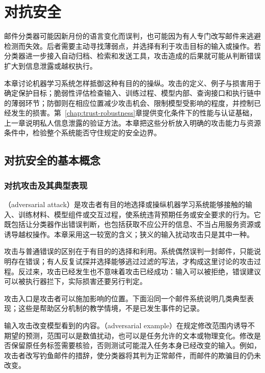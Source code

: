 \chapter{对抗安全}
\label{chap:trust-security}

邮件分类器可能因新月份的语言变化而误判，也可能因为有人专门改写邮件来逃避检测而失效。后者需要主动寻找薄弱点，并选择有利于攻击目标的输入或操作。若分类器进一步接入自动归档、检索和发送工具，攻击造成的后果就可能从判断错误扩大到信息泄露或越权执行。

本章讨论机器学习系统怎样抵御这种有目的的操纵。攻击的定义、例子与损害用于确定保护目标；脆弱性评估检查输入、训练过程、模型内部、查询接口和执行链中的薄弱环节；防御则在相应位置减少攻击机会、限制模型受影响的程度，并控制已经发生的损害。第~\ref{chap:trust-robustness}章提供变化条件下的性能与认证基础，上一章说明私人信息泄露的验证方法。本章把这些分析放入明确的攻击能力与资源条件中，检验整个系统能否守住规定的安全边界。

\section{对抗安全的基本概念}
\label{sec:security-threats}

\subsection{对抗攻击及其典型表现}
\label{sec:security-attack-definition}

（adversarial attack）是攻击者有目的地选择或操纵机器学习系统能够接触的输入、训练材料、模型组件或交互过程，使系统违背预期任务或安全要求的行为。它既包括让分类器作出错误判断，也包括获取不应公开的信息、不当占用服务资源或诱导越权操作。本章采用这一较宽的含义；狭义的输入扰动攻击只是其中一种。

攻击与普通错误的区别在于有目的的选择和利用。系统偶然误判一封邮件，只能说明存在错误；有人反复试探并选择能够逃过过滤的写法，才构成这里讨论的攻击过程。反过来，攻击已经发生也不意味着攻击已经成功：输入可以被拒绝，错误建议可以被执行器拦下，实际损害还要另行判定。

攻击入口是攻击者可以施加影响的位置。下面沿同一个邮件系统说明几类典型表现；这些是帮助区分机制的教学情境，不是已发生事件的记录。

输入攻击改变模型看到的内容。（adversarial example）在规定修改范围内诱导不期望的预测，范围可以是数值扰动，也可以是任务允许的文本或物理变化。修改是否保留原任务标签需要核验，否则测试可能混入任务本身已经改变的输入。例如，攻击者改写钓鱼邮件的措辞，使分类器将其判为正常邮件，而邮件的欺骗目的仍未改变。

